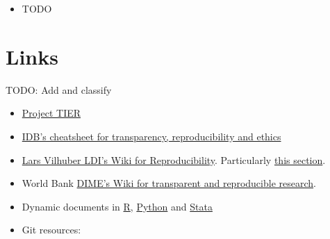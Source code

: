 \documentclass[]{book}
\providecommand{\tightlist}{%
  \setlength{\itemsep}{0pt}\setlength{\parskip}{0pt}}
\begin{document}
\begin{itemize}
\tightlist
\item
  TODO
\end{itemize}

\hypertarget{links}{%
\section{Links}\label{links}}

TODO: Add and classify

\begin{itemize}
\tightlist
\item
  \href{https://www.projecttier.org/tier-protocol/}{Project TIER}\\
\item
  \href{http://idbdocs.iadb.org/wsdocs/getdocument.aspx?docnum=EZSHARE-1350314980-383}{IDB's cheatsheet for transparency, reproducibility and ethics}\\
\item
  \href{https://github.com/labordynamicsinstitute/replicability-training/wiki}{Lars Vilhuber LDI's Wiki for Reproducibility}. Particularly \href{https://github.com/labordynamicsinstitute/replicability-training/wiki/Prepare_and_run_replication}{this section}.\\
\item
  World Bank \href{https://dimewiki.worldbank.org/wiki/Main_Page}{DIME's Wiki for transparent and reproducible research}.
\item
  Dynamic documents in \href{https://rmarkdown.rstudio.com/gallery.html}{R}, \href{https://github.com/jupyter/jupyter/wiki/A-gallery-of-interesting-Jupyter-Notebooks\#economics-and-finance}{Python} and \href{https://github.com/BITSS/CEGA2019/blob/master/03-extra_dynamic_docs/02b-Stata-markdown/Stata\%20Markdown.pdf}{Stata}\\
\item
  Git resources:


\end{itemize}
\end{document}
